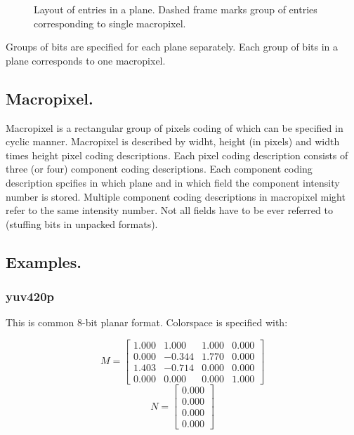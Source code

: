 \begin{figure}[ht]
  \begin{center}
    \def\svgwidth{380pt}
    
    \caption{Layout of entries in a plane. Dashed frame marks group of entries corresponding to single macropixel.\label{fig:entries_in_plane}}
  \end{center}
\end{figure}

Groups of bits are specified for each plane separately. Each group of bits in a plane corresponds to one macropixel.

\subsection{Macropixel.}

Macropixel is a rectangular group of pixels coding of which can be specified in cyclic manner. Macropixel is described by widht, height (in pixels) and width times height pixel coding descriptions. Each pixel coding description consists of three (or four) component coding descriptions. Each component coding description spcifies in which plane and in which field the component intensity number is stored. Multiple component coding descriptions in macropixel might refer to the same intensity number. Not all fields have to be ever referred to (stuffing bits in unpacked formats).

\subsection{Examples.}

\subsubsection{yuv420p}

This is common 8-bit planar format. Colorspace is specified with:

\begin{displaymath}
M =
  \left[ \begin{array}{ rrrr }
    1.000 & 1.000 & 1.000 & 0.000 \\
    0.000 & -0.344 & 1.770 & 0.000 \\
    1.403 & -0.714 & 0.000 & 0.000 \\
    0.000 & 0.000 & 0.000 & 1.000
  \end{array} \right]
\end{displaymath}
\begin{displaymath}
N =
  \left[ \begin{array}{ r }
    0.000 \\
    0.000 \\
    0.000 \\
    0.000
  \end{array} \right]
\end{displaymath}

